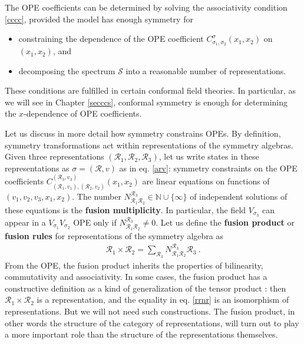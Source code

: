\documentclass[12pt, a4paper, notitlepage, twoside]{report}
\numberwithin{equation}{section}
\theoremstyle{break}
\begin{document}
The OPE coefficients can be determined by solving the associativity condition \eqref{cccc}, provided the model has enough symmetry for 
\begin{itemize}
 \item constraining the dependence of the OPE coefficient $C_{\sigma_1,\sigma_2}^{\sigma}(x_1,x_2)$ on $(x_1,x_2)$, and
\item decomposing the spectrum $\mathcal{S}$ into a reasonable number of representations.
\end{itemize}
These conditions are fulfilled in certain conformal field theories.
In particular, as we will see in Chapter \ref{secccs}, conformal symmetry is enough for determining the $x$-dependence of OPE coefficients. 

Let us discuss in more detail how symmetry constrains OPEs. By definition, symmetry transformations act within representations of the symmetry algebras. Given three representations $(\mathcal{R}_1,\mathcal{R}_2,\mathcal{R}_3)$, let us write states in these representations as $\sigma=(\mathcal{R},v)$ as in eq. \eqref{arv}: symmetry constraints on the OPE coefficients $C_{(\mathcal{R}_1,v_1),(\mathcal{R}_2,v_2)}^{(\mathcal{R}_3,v_3)}(x_1,x_2)$ are linear equations on functions of $(v_1,v_2,v_3,x_1,x_2)$. The number $N_{\mathcal{R}_1\mathcal{R}_2}^{\mathcal{R}_3}\in {\mathbb{N}} \cup \{\infty\}$ of independent solutions of these equations is the \textbf{\boldmath fusion multiplicity}. 
In particular, the field $V_{\sigma_3}$ can appear in a $V_{\sigma_1}V_{\sigma_2}$ OPE only if $N_{\mathcal{R}_1\mathcal{R}_2}^{\mathcal{R}_3}\neq 0$. Let us define the \textbf{\boldmath fusion product} or \textbf{\boldmath fusion rules} for representations of the symmetry algebra as 
 \begin{align}
 \mathcal{R}_1 \times \mathcal{R}_2  = \sum_{\mathcal{R}_3} N_{\mathcal{R}_1\mathcal{R}_2}^{\mathcal{R}_3} \mathcal{R}_3 \ . 
\label{rrnr}
\end{align}
From the OPE, the fusion product inherits the properties of bilinearity, commutativity and associativity. 
In some cases, the fusion product has a constructive definition as a kind of generalization of the tensor product \cite{gab99, kr18}: then $ \mathcal{R}_1 \times \mathcal{R}_2$ is a representation, and the equality in eq. \eqref{rrnr} is an isomorphism of representations. But we will not need such constructions. The fusion product, in other words the structure of the category of representations, will turn out to play a more important role than the structure of the representations themselves.  
\end{document}
